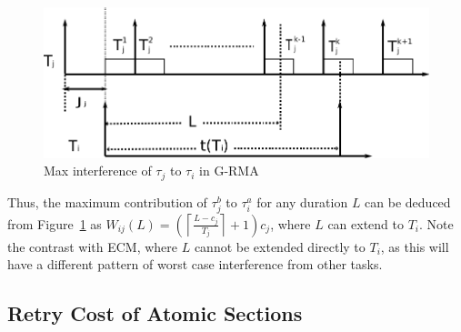 \documentclass[letter]{sig-alternate}
\begin{document}
\begin{figure}[htbp]
\centering
\includegraphics[scale=0.5]{figures/figure11}\caption{\label{fig11}Max interference of $\tau_{j}$ to $\tau_{i}$ in G-RMA}
\end{figure}

Thus, the maximum contribution of $\tau_{j}^b$ to $\tau_{i}^a$ for any duration
$L$ can be deduced from Figure~\ref{fig11} as $W_{ij}(L)=\left(\left\lceil\frac{L-c_{j}}{T_{j}}\right\rceil+1 \right)c_{j}$,
where $L$ can extend to $T_{i}$. Note the contrast with ECM, where $L$ cannot be extended directly to $T_i$, as this will have a different pattern of worst case interference from other tasks.

\subsection{Retry Cost of Atomic Sections}
\end{document}
